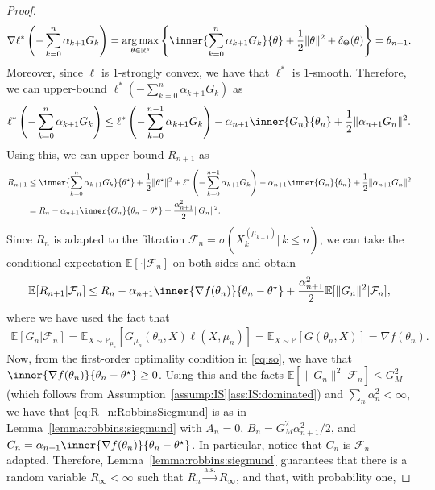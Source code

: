 \documentclass[11pt,a4paper]{article}
\theoremstyle{definition}
\DeclareMathOperator*{\argmax}{arg\,max}
\begin{document}
\begin{proof}
\begin{align*}
    \nabla \ell^*\left(-\sum_{k=0}^n \alpha_{k+1} G_k\right) = \argmax_{\theta \in \mathbb R^s} \left\{ \inner{\sum_{k=0}^n \alpha_{k+1} G_k}{\theta} + \frac{1}{2}\|\theta\|^2 + \delta_{\Theta}(\theta) \right\}=\theta_{n+1}.
\end{align*}
Moreover, since $\ell$ is $1$-strongly convex, we have that $\ell^*$ is $1$-smooth. Therefore, we can upper-bound $\ell^*(-\sum_{k=0}^n \alpha_{k+1} G_k)$ as
\begin{align*}
    \ell^*\left( -\sum_{k=0}^n \alpha_{k+1} G_k \right) \leq \ell^*\left( -\sum_{k=0}^{n-1} \alpha_{k+1} G_k \right) - \alpha_{n+1} \inner{G_n}{\theta_n} + \frac{1}{2} \|\alpha_{n+1} G_n\|^2.
\end{align*}
Using this, we can upper-bound $R_{n+1}$ as
\begin{align*}
    R_{n+1} &\leq \inner{\sum_{k=0}^n \alpha_{k+1} G_k}{\theta^\star} + \frac{1}{2}\|\theta^\star\|^2 + \ell^*\left( -\sum_{k=0}^{n-1} \alpha_{k+1} G_k \right) - \alpha_{n+1} \inner{G_n}{\theta_n} + \frac{1}{2} \|\alpha_{n+1} G_n\|^2 \\
    &= R_n - \alpha_{n+1}\inner{G_n}{\theta_n - \theta^\star} + \frac{\alpha_{n+1}^2}{2}\|G_n\|^2.
\end{align*}
Since $R_n$ is adapted to the filtration $\mathcal F_n = \sigma(X_k^{(\mu_{k-1})} |\, k \leq n)$, we can take the conditional expectation $\mathbb E[\cdot | \mathcal F_n]$ on both sides and obtain
\begin{align}
\label{eq:R_n:RobbinsSiegmund}
    \mathbb E[R_{n+1} | \mathcal F_n] \leq R_n - \alpha_{n+1}\inner{\nabla f(\theta_n)}{\theta_n - \theta^\star} + \frac{\alpha_{n+1}^2}{2} \mathbb E[\|G_n\|^2 | \mathcal F_n],
\end{align}
where we have used the fact that
\begin{align*}
    \mathbb E[G_n | \mathcal F_n] = \mathbb E_{X \sim \mathbb P_{\mu_n}}\left[ G_{\mu_n}(\theta_n, X)  \ell(X,\mu_n) \right] = \mathbb E_{X \sim \mathbb P}\left[ G(\theta_n, X) \right] = \nabla f(\theta_n).
\end{align*}
Now, from the first-order optimality condition in \eqref{eq:so}, we have that $\inner{\nabla f(\theta_n)}{\theta_n - \theta^\star} \geq 0$. Using this and the facts $\mathbb E[\|G_n\|^2 | \mathcal F_n] \leq G_M^2$ (which follows from Assumption~\ref{assump:IS}\ref{ass:IS:dominated}) and $\sum_{n}\alpha_{n}^2 < \infty$, we have that \eqref{eq:R_n:RobbinsSiegmund} is as in Lemma~\ref{lemma:robbins:siegmund} with $A_n = 0$, $B_n = G_M^2 \alpha_{n+1}^2/2$, and $C_n = \alpha_{n+1}\inner{\nabla f(\theta_n)}{\theta_n - \theta^\star}$. In particular, notice that $C_n$ is $\mathcal F_n$-adapted. Therefore, Lemma~\ref{lemma:robbins:siegmund} guarantees that there is a random variable $R_\infty < \infty$ such that $R_n \overset{\text{a.s.}}{\to} R_\infty$, and that, with probability one,

\end{proof}
\end{document}
